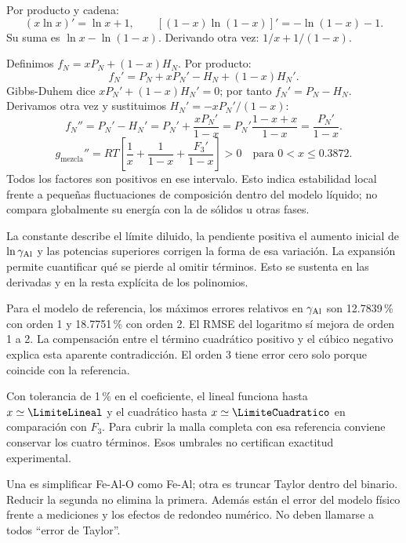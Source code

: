 Por producto y cadena:
\[
(x\ln x)'=\ln x+1,\qquad
[(1-x)\ln(1-x)]'=-\ln(1-x)-1.
\]
Su suma es $\ln x-\ln(1-x)$. Derivando otra vez: $1/x+1/(1-x)$.

Definimos $f_N=xP_N+(1-x)H_N$. Por producto:
\[
f_N'=P_N+xP_N'-H_N+(1-x)H_N'.
\]
Gibbs-Duhem dice $xP_N'+(1-x)H_N'=0$; por tanto $f_N'=P_N-H_N$. Derivamos otra vez y sustituimos $H_N'=-xP_N'/(1-x)$:
\[
f_N''=P_N'-H_N'=P_N'+\frac{xP_N'}{1-x}
=P_N'\frac{1-x+x}{1-x}=\frac{P_N'}{1-x}.
\]
\[
g_{\mathrm{mezcla}}''=RT\left[\frac1x+\frac1{1-x}+\frac{F_3'}{1-x}\right]>0
\quad\text{para }0<x\leq0.3872.
\]
Todos los factores son positivos en ese intervalo. Esto indica estabilidad local frente a pequeñas fluctuaciones de composición dentro del modelo líquido; no compara globalmente su energía con la de sólidos u otras fases.

La constante describe el límite diluido, la pendiente positiva el aumento inicial de $\ln\gamma_{\mathrm{Al}}$ y las potencias superiores corrigen la forma de esa variación. La expansión permite cuantificar qué se pierde al omitir términos. Esto se sustenta en las derivadas y en la resta explícita de los polinomios.

Para el modelo de referencia, los máximos errores relativos en $\gamma_{\mathrm{Al}}$ son 12.7839\,\% con orden 1 y 18.7751\,\% con orden 2. El RMSE del logaritmo sí mejora de orden 1 a 2. La compensación entre el término cuadrático positivo y el cúbico negativo explica esta aparente contradicción. El orden 3 tiene error cero solo porque coincide con la referencia.

Con tolerancia de 1\,\% en el coeficiente, el lineal funciona hasta $x\simeq\LimiteLineal$ y el cuadrático hasta $x\simeq\LimiteCuadratico$ en comparación con $F_3$. Para cubrir la malla completa con esa referencia conviene conservar los cuatro términos. Esos umbrales no certifican exactitud experimental.

Una es simplificar Fe-Al-O como Fe-Al; otra es truncar Taylor dentro del binario. Reducir la segunda no elimina la primera. Además están el error del modelo físico frente a mediciones y los efectos de redondeo numérico. No deben llamarse a todos ``error de Taylor''.

